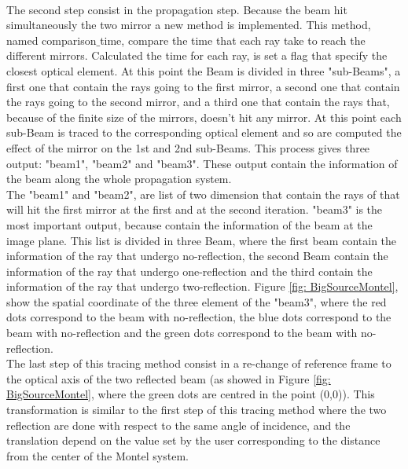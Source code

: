 \\
The second step consist in the propagation step. Because the beam hit simultaneously the two mirror a new method is implemented. This method, named comparison$\_ $time, compare the time that each ray take to reach the different mirrors. Calculated the time for each ray, is set a flag that specify the closest optical element. At this point the Beam is divided in three "sub-Beams", a first one that contain the rays going to the first mirror, a second one that contain the rays going to the second mirror, and a third one that contain the rays that, because of the finite size of the mirrors, doesn't hit any mirror. At this point each sub-Beam is traced to the corresponding optical element and so are computed the effect of the mirror on the 1st and 2nd sub-Beams. This process gives three output: "beam1", "beam2" and "beam3". These output contain the information of the beam along the whole propagation system.
\\
%
%
%
%
%
The "beam1" and "beam2", are list of two dimension that contain the rays of that will hit the first mirror at the first and at the second iteration. "beam3" is the most important output, because contain the information of the beam at the image plane. This list is divided in three Beam, where the first beam contain the information of the ray that undergo no-reflection, the second Beam contain the information of the ray that undergo one-reflection and the third contain the information of the ray that undergo two-reflection.
Figure \ref{fig: BigSourceMontel}, show the spatial coordinate of the three element of the "beam3", where the red dots correspond to the beam with no-reflection, the blue dots correspond to the beam with no-reflection and the green dots correspond to the beam with no-reflection.
\\
The last step of this tracing method consist in a re-change of reference frame to the optical axis of the two reflected beam (as showed in Figure \ref{fig: BigSourceMontel}, where the green dots are centred in the point (0,0)). This transformation is similar to the first step of this tracing method where the two reflection are done with respect to the same angle of incidence, and the translation depend on the value set by the user corresponding to the distance from the center of the Montel system.
\\
